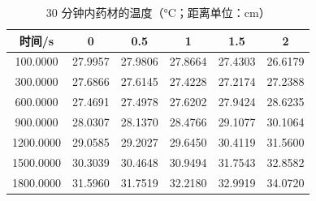 \begin{table}[htbp]
  \centering
  \caption{30 分钟内药材的温度（°C；距离单位：cm）}
  \label{tab:q1-temperature}
  \begin{tabular}{cccccc}
    \toprule
    时间/s & 0 & 0.5 & 1 & 1.5 & 2 \\
    \midrule
    100.0000 & 27.9957 & 27.9806 & 27.8664 & 27.4303 & 26.6179 \\
    300.0000 & 27.6866 & 27.6145 & 27.4228 & 27.2174 & 27.2388 \\
    600.0000 & 27.4691 & 27.4978 & 27.6202 & 27.9424 & 28.6235 \\
    900.0000 & 28.0307 & 28.1370 & 28.4766 & 29.1077 & 30.1064 \\
    1200.0000 & 29.0585 & 29.2027 & 29.6450 & 30.4119 & 31.5600 \\
    1500.0000 & 30.3039 & 30.4648 & 30.9494 & 31.7543 & 32.8582 \\
    1800.0000 & 31.5960 & 31.7519 & 32.2180 & 32.9919 & 34.0720 \\
    \bottomrule
  \end{tabular}
\end{table}
